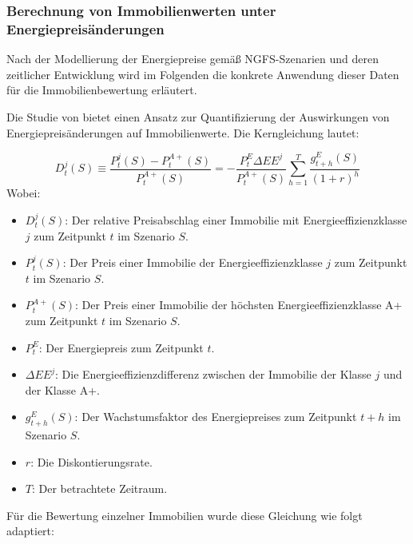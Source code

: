 \subsubsection{Berechnung von Immobilienwerten unter Energiepreisänderungen}
Nach der Modellierung der Energiepreise gemäß NGFS-Szenarien und deren zeitlicher Entwicklung wird im Folgenden die konkrete Anwendung dieser Daten für die Immobilienbewertung erläutert.

Die Studie von \parencite{tergerman} bietet einen Ansatz zur Quantifizierung der Auswirkungen von Energiepreisänderungen auf Immobilienwerte. Die Kerngleichung lautet:

\begin{equation}
D^j_t(S) \equiv \frac{P^j_t(S) - P^{A+}_t(S)}{P^{A+}_t(S)} = -\frac{P^E_t \Delta EE^j}{P^{A+}_t(S)} \sum_{h=1}^T \frac{g^E_{t+h}(S)}{(1 + r)^h}
\end{equation}
Wobei:
\begin{itemize}
    \item $D^j_t(S)$: Der relative Preisabschlag einer Immobilie mit Energieeffizienzklasse $j$ zum Zeitpunkt $t$ im Szenario $S$.
    \item $P^j_t(S)$: Der Preis einer Immobilie der Energieeffizienzklasse $j$ zum Zeitpunkt $t$ im Szenario $S$.
    \item $P^{A+}_t(S)$: Der Preis einer Immobilie der höchsten Energieeffizienzklasse A+ zum Zeitpunkt $t$ im Szenario $S$.
    \item $P^E_t$: Der Energiepreis zum Zeitpunkt $t$.
    \item $\Delta EE^j$: Die Energieeffizienzdifferenz zwischen der Immobilie der Klasse $j$ und der Klasse A+.
    \item $g^E_{t+h}(S)$: Der Wachstumsfaktor des Energiepreises zum Zeitpunkt $t+h$ im Szenario $S$.
    \item $r$: Die Diskontierungsrate.
    \item $T$: Der betrachtete Zeitraum.
\end{itemize}
Für die Bewertung einzelner Immobilien wurde diese Gleichung wie folgt adaptiert:

